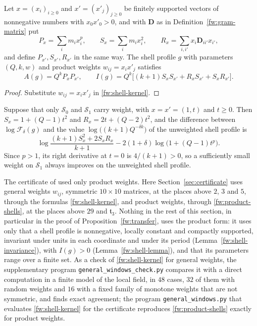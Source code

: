 \begin{corollary}\label{fw:product-weights}
Let $x=(x_i)_{i\ge0}$ and $x'=(x'_j)_{j\ge0}$ be finitely supported
vectors of nonnegative numbers with $x_0x'_0>0$, and with $\mathbf D$ as in
Definition~\ref{fw:gram-matrix} put
\[
 P_x=\sum_im_ix_i^p,\qquad S_x=\sum_im_ix_i^2,\qquad
 R_x=\sum_{i,i'}x_i\mathbf D_{ii'}x_{i'},
\]
and define $P_{x'},S_{x'},R_{x'}$ in the same way. The shell profile
$g$ with parameters $(Q,k,w)$ and product weights $w_{ij}=x_ix'_j$
satisfies
\begin{equation}\label{fw:product-shells}
 A(g)=Q^kP_xP_{x'},\qquad
 I(g)=Q^k\bigl[(k+1)S_xS_{x'}+R_xS_{x'}+S_xR_{x'}\bigr].
\end{equation}
\end{corollary}

\begin{proof}
Substitute $w_{ij}=x_ix'_j$ in \eqref{fw:shell-kernel}.
\end{proof}

\begin{remark}\label{fw:one-shell}
Suppose that only $\mathcal S_0$ and $\mathcal S_1$ carry weight, with
$x=x'=(1,t)$ and $t\ge0$. Then $S_x=1+(Q-1)t^2$ and
$R_x=2t+(Q-2)t^2$, and the difference between $\log\mathcal F_\delta(g)$
and the value $\log\bigl((k+1)Q^{-\delta k}\bigr)$ of the unweighted
shell profile is
\begin{equation}\label{fw:one-shell-gain}
 \log\frac{(k+1)S_x^2+2S_xR_x}{k+1}-2(1+\delta)\log\bigl(1+(Q-1)t^p\bigr).
\end{equation}
Since $p>1$, its right derivative at $t=0$ is $4/(k+1)>0$, so a
sufficiently small weight on $\mathcal S_1$ always improves on the
unweighted shell profile.
\end{remark}

\begin{remark}\label{fw:general-weights}
The certificate of \cite{Naslund04273} used only product weights. Here
Section~\ref{sec:certificate} uses general weights $w_{ij}$, symmetric
$10\times10$ matrices, at the places above $2$, $3$ and $5$, through the
formulas \eqref{fw:shell-kernel}, and product weights, through
\eqref{fw:product-shells}, at the places above $29$ and $\mathfrak t_3$.
Nothing in the rest of this section, in particular in the proof of
Proposition~\ref{fw:transfer}, uses the product form: it uses only that a
shell profile is nonnegative, locally constant and compactly supported,
invariant under units in each coordinate and under its period
(Lemma~\ref{fw:shell-invariance}), with $I(g)>0$
(Lemma~\ref{fw:shell-lemma}), and that its parameters range over a finite
set. As a check of \eqref{fw:shell-kernel} for general weights, the
supplementary program \texttt{general\_windows\_check.py} compares it with a
direct computation in a finite model of the local field, in $48$ cases, $32$ of
them with random weights and $16$ with a fixed family of monotone weights that
are not symmetric, and finds exact agreement; the program \texttt{general\_windows.py} that evaluates
\eqref{fw:shell-kernel} for the certificate reproduces
\eqref{fw:product-shells} exactly for product weights.
\end{remark}

